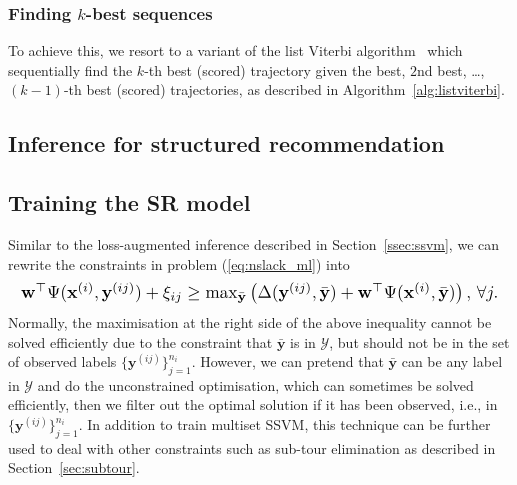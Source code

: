 \subsubsection{Finding $k$-best sequences}
To achieve this, we resort to a variant of the list Viterbi algorithm~\cite{nilsson2001sequentially,seshadri1994list}
which sequentially find the $k$-th best (scored) trajectory given the best, $2$nd best, \dots, $(k-1)$-th best (scored) trajectories,
as described in Algorithm~\ref{alg:listviterbi}.


\subsection{Inference for structured recommendation}
\label{ssec:SRinf}



\subsection{Training the SR model}
\label{ssec:SRtrain}


Similar to the loss-augmented inference described in Section~\ref{ssec:ssvm}, 
we can rewrite the constraints in problem (\ref{eq:nslack_ml}) into
\begin{equation*}
\resizebox{0.99\linewidth}{!}
{$
\mathbf{w}^\top \Psi(\mathbf{x}^{(i)}, \mathbf{y}^{(ij)}) + \xi_{ij} \ge 
\max_{\bar{\mathbf{y}}} \left( \Delta(\mathbf{y}^{(ij)}, \bar{\mathbf{y}}) + \mathbf{w}^\top \Psi(\mathbf{x}^{(i)}, \bar{\mathbf{y}}) \right),
\, \forall j.
$}
\end{equation*} 
Normally, the maximisation at the right side of the above inequality cannot be solved efficiently due to the constraint that 
$\bar{\mathbf{y}}$ is in $\mathcal{Y}$,
but should not be in the set of observed labels $\{\mathbf{y}^{(ij)}\}_{j=1}^{n_i}$.
However, we can pretend that $\bar{\mathbf{y}}$ can be any label in $\mathcal{Y}$ and do the unconstrained optimisation,
which can sometimes be solved efficiently, then we filter out the optimal solution if it has been observed, 
i.e., in $\{\mathbf{y}^{(ij)}\}_{j=1}^{n_i}$. 
In addition to train multiset SSVM, this technique can be further used to deal with other constraints such as sub-tour elimination 
as described in Section~\ref{sec:subtour}.






